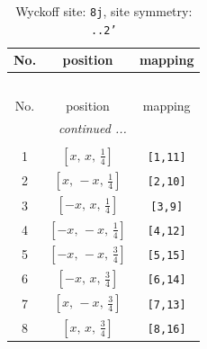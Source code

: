 \documentclass[fleqn,8pt]{jsarticle}
\begin{document}
\begin{longtable}{ccc}
\caption{Wyckoff site: {\tt 8j}, site symmetry: {\tt ..2'}}
 \\
 \hline \hline
No. & position & mapping \\ \hline \endfirsthead

\multicolumn{2}{l}{\tablename\ \thetable{}} \\
 \hline \hline
No. & position & mapping \\ \hline \endhead

 \hline \hline
\multicolumn{2}{r}{\footnotesize\it continued ...} \\ \endfoot

 \hline \hline
\multicolumn{2}{r}{} \\ \endlastfoot

1 & $\left[ x,\, x,\, \frac{1}{4} \right]$ & {\tt [1,11]} \\ \hline
2 & $\left[ x,\, - x,\, \frac{1}{4} \right]$ & {\tt [2,10]} \\ \hline
3 & $\left[ - x,\, x,\, \frac{1}{4} \right]$ & {\tt [3,9]} \\ \hline
4 & $\left[ - x,\, - x,\, \frac{1}{4} \right]$ & {\tt [4,12]} \\ \hline
5 & $\left[ - x,\, - x,\, \frac{3}{4} \right]$ & {\tt [5,15]} \\ \hline
6 & $\left[ - x,\, x,\, \frac{3}{4} \right]$ & {\tt [6,14]} \\ \hline
7 & $\left[ x,\, - x,\, \frac{3}{4} \right]$ & {\tt [7,13]} \\ \hline
8 & $\left[ x,\, x,\, \frac{3}{4} \right]$ & {\tt [8,16]} \\
\end{longtable}
\renewcommand{\arraystretch}{1.2}
\end{document}
